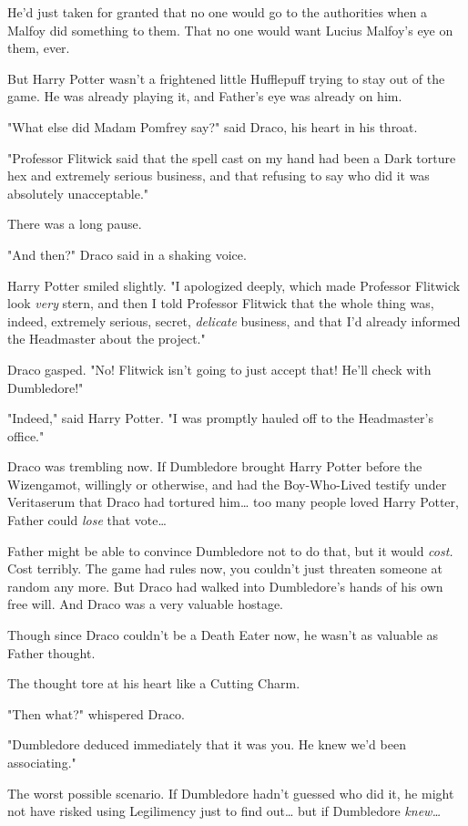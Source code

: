 He'd just taken for granted that no one would go to the authorities when a 
Malfoy did something to them. That no one would want Lucius Malfoy's eye on 
them, ever.

But Harry Potter wasn't a frightened little Hufflepuff trying to stay out of 
the game. He was already playing it, and Father's eye was already on him.

"What else did Madam Pomfrey say?" said Draco, his heart in his throat.

"Professor Flitwick said that the spell cast on my hand had been a Dark torture 
hex and extremely serious business, and that refusing to say who did it was 
absolutely unacceptable."

There was a long pause.

"And then?" Draco said in a shaking voice.

Harry Potter smiled slightly. "I apologized deeply, which made Professor 
Flitwick look \emph{very} stern, and then I told Professor Flitwick that the 
whole thing was, indeed, extremely serious, secret, \emph{delicate} business, 
and that I'd already informed the Headmaster about the project."

Draco gasped. "No! Flitwick isn't going to just accept that! He'll check with 
Dumbledore!"

"Indeed," said Harry Potter. "I was promptly hauled off to the Headmaster's 
office."

Draco was trembling now. If Dumbledore brought Harry Potter before the 
Wizengamot, willingly or otherwise, and had the Boy-Who-Lived testify under 
Veritaserum that Draco had tortured him{\ldots} too many people loved Harry 
Potter, Father could \emph{lose} that vote{\ldots}

Father might be able to convince Dumbledore not to do that, but it would 
\emph{cost.} Cost terribly. The game had rules now, you couldn't just threaten 
someone at random any more. But Draco had walked into Dumbledore's hands of his 
own free will. And Draco was a very valuable hostage.

Though since Draco couldn't be a Death Eater now, he wasn't as valuable as 
Father thought.

The thought tore at his heart like a Cutting Charm.

"Then what?" whispered Draco.

"Dumbledore deduced immediately that it was you. He knew we'd been associating."

The worst possible scenario. If Dumbledore hadn't guessed who did it, he might 
not have risked using Legilimency just to find out{\ldots} but if Dumbledore 
\emph{knew{\ldots}}

